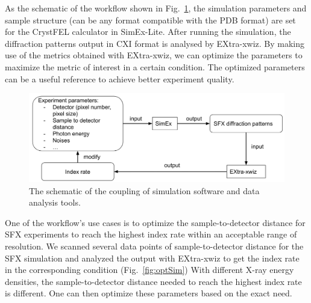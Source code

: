 \documentclass[11pt, a4paper]{article}
\begin{document}
As the schematic of the workflow shown in Fig.~\ref{fig:feedbackloop}, the simulation parameters and sample structure (can be any format compatible with the PDB format) are set for the CrystFEL calculator in SimEx-Lite. After running the simulation, the diffraction patterns output in CXI format is analysed by EXtra-xwiz. By making use of the metrics obtained with EXtra-xwiz, we can optimize the parameters to maximize the metric of interest in a certain condition. The optimized parameters can be a useful reference to achieve better experiment quality.

\begin{figure}[h!!!]
    \centering
    \includegraphics[width=0.75\columnwidth]{figures/feedbackloop.png}
    \caption{The schematic of the coupling of simulation software and data analysis tools.}
    \label{fig:feedbackloop}
\end{figure}
One of the workflow's use cases is to optimize the sample-to-detector distance for SFX experiments to reach the highest index rate within an acceptable range of resolution. We scanned several data points of sample-to-detector distance for the SFX simulation and analyzed the output with EXtra-xwiz to get the index rate in the corresponding condition (Fig.~\ref{fig:optSim}) With different X-ray energy densities, the sample-to-detector distance needed to reach the highest index rate is different. One can then optimize these parameters based on the exact need.
\end{document}
